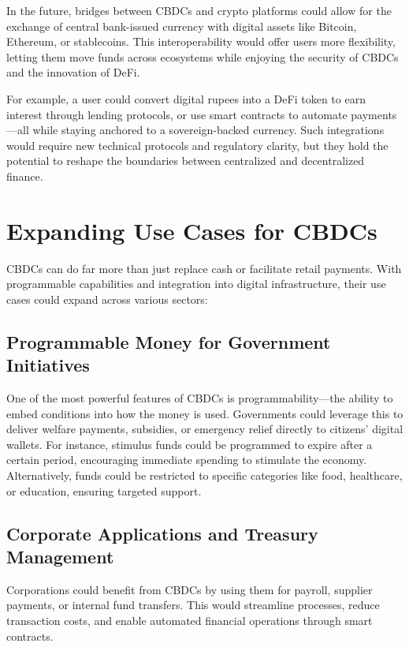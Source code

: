 In the future, bridges between CBDCs and crypto platforms could allow for the exchange of central bank-issued currency with digital assets like Bitcoin, Ethereum, or stablecoins. This interoperability would offer users more flexibility, letting them move funds across ecosystems while enjoying the security of CBDCs and the innovation of DeFi.

For example, a user could convert digital rupees into a DeFi token to earn interest through lending protocols, or use smart contracts to automate payments—all while staying anchored to a sovereign-backed currency. Such integrations would require new technical protocols and regulatory clarity, but they hold the potential to reshape the boundaries between centralized and decentralized finance.

\section{Expanding Use Cases for CBDCs}

CBDCs can do far more than just replace cash or facilitate retail payments. With programmable capabilities and integration into digital infrastructure, their use cases could expand across various sectors:

\subsection{Programmable Money for Government Initiatives}

One of the most powerful features of CBDCs is programmability—the ability to embed conditions into how the money is used. Governments could leverage this to deliver welfare payments, subsidies, or emergency relief directly to citizens’ digital wallets. For instance, stimulus funds could be programmed to expire after a certain period, encouraging immediate spending to stimulate the economy. Alternatively, funds could be restricted to specific categories like food, healthcare, or education, ensuring targeted support.

\subsection{Corporate Applications and Treasury Management}

Corporations could benefit from CBDCs by using them for payroll, supplier payments, or internal fund transfers. This would streamline processes, reduce transaction costs, and enable automated financial operations through smart contracts.

